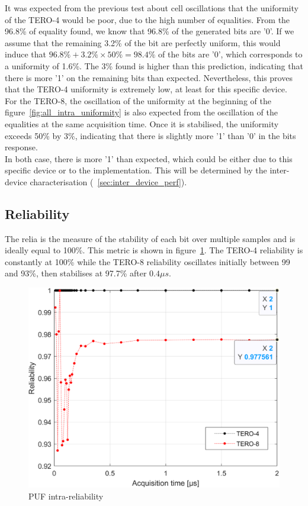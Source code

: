 It was expected from the previous test about cell oscillations that the uniformity of the TERO-4 would be poor, due to the high number of equalities. From the 96.8\% of equality found, we know that 96.8\% of the generated bits are '0'. If we assume that the remaining 3.2\% of the bit are perfectly uniform, this would induce that $96.8\% + 3.2\%\times50\% = 98.4\%$ of the bits are '0', which corresponds to a uniformity of 1.6\%. The 3\% found is higher than this prediction, indicating that there is more '1' on the remaining bits than expected. Nevertheless, this proves that the TERO-4 uniformity is extremely low, at least for this specific device.\\


For the TERO-8, the oscillation of the uniformity at the beginning of the figure~\ref{fig:all_intra_uniformity} is also expected from the oscillation of the equalities at the same acquisition time. Once it is stabilised, the uniformity exceeds 50\% by 3\%, indicating that there is slightly more '1' than '0' in the bits response.\\

In both case, there is more '1' than expected, which could be either due to this specific device or to the implementation. This will be determined by the inter-device characterisation (~\ref{sec:inter_device_perf}).

\subsection{Reliability}


The \acrfull{relia} is the measure of the stability of each bit over multiple samples and is ideally equal to 100\%. This metric is shown in figure~\ref{fig:all_intra_reliability}. The TERO-4 reliability is constantly at 100\% while the TERO-8 reliability oscillates initially between 99 and 93\%, then stabilises at 97.7\% after $0.4\mu s$.

\begin{figure}[H]
    \centering
    \includegraphics[width=0.8\linewidth]{images/all_intra_reliability.png}
    \caption{PUF intra-reliability}
    \label{fig:all_intra_reliability}
\end{figure}

